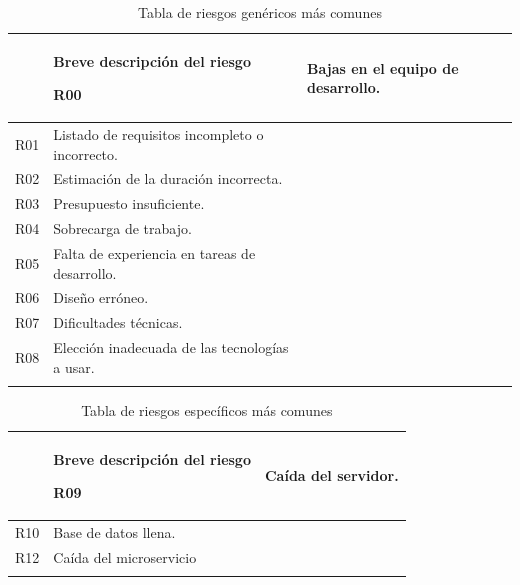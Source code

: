 \documentclass[pdftex,11pt,a4paper]{book}
\begin{document}
\begin{center}
\begin{longtable}{|>{\centering\arraybackslash}X m{}|m{10cm}|}
\hline
{\centering \textbf{ID}} &
{\centering \begin{center} \textbf{Breve descripción del riesgo} \end{center}}
\hline 
\endhead

R00 & Bajas en el equipo de desarrollo. \\ \hline
R01 & Listado de requisitos incompleto o incorrecto. \\ \hline
R02 & Estimación de la duración incorrecta. \\ \hline
R03 & Presupuesto insuficiente. \\ \hline
R04 & Sobrecarga de trabajo. \\ \hline
R05 & Falta de experiencia en tareas de desarrollo. \\ \hline
R06 & Diseño erróneo. \\ \hline
R07 & Dificultades técnicas. \\ \hline
R08 & Elección inadecuada de las tecnologías a usar. \\ \hline

\caption{Tabla de riesgos genéricos más comunes} \label{tablalarga:riesgos-generales}
\end{longtable}
\end{center}

\renewcommand{\tablename}{Tabla}

\renewcommand{\arraystretch}{1,7}

\begin{center}
\begin{longtable}{|>{\centering\arraybackslash}X m{}|m{10cm}|}
\hline
{\centering \textbf{ID}} &
{\centering \begin{center} \textbf{Breve descripción del riesgo} \end{center}}
\hline 
\endhead

R09 & Caída del servidor. \\ \hline
R10 & Base de datos llena.  \\ \hline
R12 & Caída del microservicio \\ \hline

\caption{Tabla de riesgos específicos más comunes} \label{tablalarga:riesgos-especificos}
\end{longtable}
\end{center}
\end{document}
